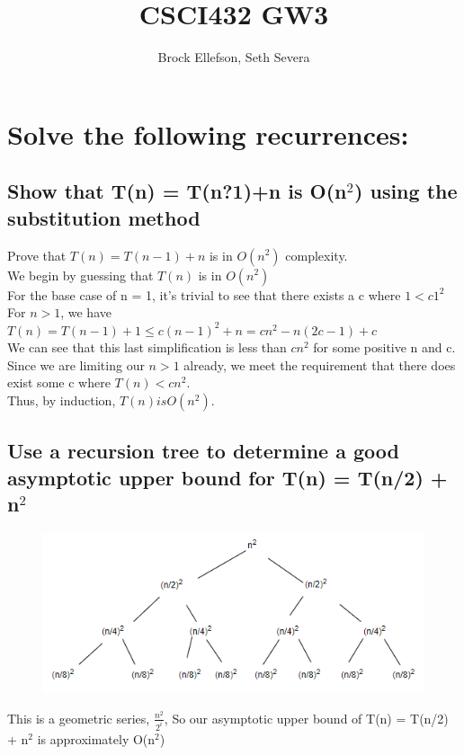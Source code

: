 \documentclass[10pt,letterpaper]{article}
\author{Brock Ellefson, Seth Severa}
\title{CSCI432 GW3}
\begin{document}
\maketitle
\section{ Solve the following recurrences:}
\subsection{Show that T(n) = T(n?1)+n is O(n$^{2}$) using the substitution method}
Prove that $T(n) = T(n-1) + n$ is in $O(n^2)$ complexity.\\
We begin by guessing that $T(n)$ is in $O(n^2)$\\
For the base case of n = 1, it's trivial to see that there exists a c where $1 < c1^2$ \\
For $ n > 1$, we have \\
$T(n) = T(n-1) + 1 \leq c(n-1)^2 + n = cn^2 - n(2c-1) + c$ \\
We can see that this last simplification is less than $cn^2$ for some positive n and c. Since we are limiting our $n > 1$ already, we meet the requirement that there does exist some c where $T(n) < c n^2$. \\
Thus, by induction, $T(n) is O(n^2).$

\subsection{Use a recursion tree to determine a good asymptotic upper bound for T(n) = T(n/2) + n$^{2}$}
	\begin{figure}[h]
		\includegraphics[scale = .75]{tree.png}
	\end{figure}
This is a geometric series, $\frac{n^{2}}{2^{i}}$, So our asymptotic upper bound of T(n) = T(n/2) + n$^{2}$ is approximately O(n$^{2}$)
\end{document}
